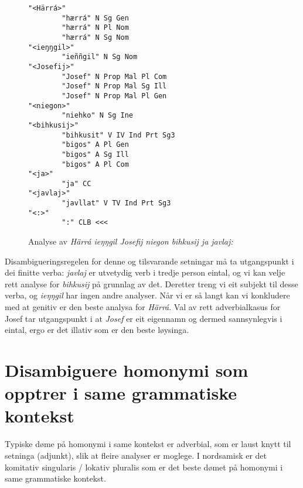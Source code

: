 \documentclass[a4paper,norsk]{article}
\begin{document}
\begin{figure}[htbp]
\begin{center}
\begin{verbatim}
"<Härrá>"
        "hærrá" N Sg Gen
        "hærrá" N Pl Nom
        "hærrá" N Sg Nom
"<ieŋŋgil>"
        "ieññgil" N Sg Nom
"<Josefij>"
        "Josef" N Prop Mal Pl Com
        "Josef" N Prop Mal Sg Ill
        "Josef" N Prop Mal Pl Gen
"<niegon>"
        "niehko" N Sg Ine
"<bihkusij>"
        "bihkusit" V IV Ind Prt Sg3
        "bigos" A Pl Gen
        "bigos" A Sg Ill
        "bigos" A Pl Com
"<ja>"
        "ja" CC
"<javlaj>" 
        "javllat" V TV Ind Prt Sg3
"<:>"
        ":" CLB <<<
\end{verbatim}
\caption{Analyse av \textit{Härrá ieŋŋgil Josefij niegon bihkusij ja javlaj:}}
\label{engelanalyse}
\end{center}
\end{figure}

Disambigueringsregelen for denne og tilsvarande setningar må ta utgangspunkt i dei finitte verba: \textit{javlaj} er utvetydig verb i tredje person eintal, og vi kan velje rett analyse for \textit{bihkusij} på grunnlag av det. Deretter treng vi eit subjekt til desse verba, og \textit{ieŋŋgil} har ingen andre analyser. Når vi er så langt kan vi konkludere med at genitiv er den beste analysa for \textit{Härrá}. Val av rett adverbialkasus for Josef tar utgangspunkt i at \textit{Josef} er eit eigennamn og dermed sannsynlegvis i eintal, ergo er det illativ som er den beste løysinga. %




\section{Disambiguere homonymi som opptrer i same grammatiske kontekst}



Typiske døme på homonymi i same kontekst er adverbial, som er laust knytt til setninga (adjunkt), slik at fleire analyser er moglege. I nordsamisk er det komitativ singularis / lokativ pluralis som er det beste dømet på homonymi i same grammatiske kontekst. %
\end{document}
